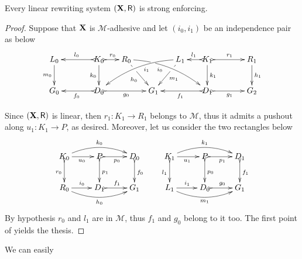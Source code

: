 \begin{proposition}\label{prop:linstrong}
	Every linear rewriting system $(\textbf {\textup{X}}, \mathsf{R})$ is strong enforcing.
\end{proposition}
\begin{proof}
	Suppose that $\textbf {\textup{X}}$ is $\mathcal{M}$-adhesive and let $(i_0, i_1)$ be
	an independence pair as below
	\[
	\xymatrix@C=15pt{L_0 \ar[d]_{m_0}&& K_0
		\ar[d]_{k_0}\ar@{>->}[ll]_{l_0} \ar@{>->}[r]^{r_0} & R_0
		\ar@/^.35cm/[drrr]|(.3)\hole_(.4){i_0} \ar[dr]|(.3)\hole_{h_0}
		&& L_1 \ar@/_.35cm/[dlll]^(.4){i_1} \ar[dl]|(.3)\hole^{m_1}& K_1
		\ar[d]^{k_1}\ar@{>->}[l]_{l_1} \ar@{>->}[rr]^{r_1} && R_1
		\ar[d]^{h_1} \\G_0 && \ar@{>->}[ll]^{f_0} D_0
		\ar@{>->}[rr]_{g_0}&& G_1 && \ar@{>->}[ll]^{f_1} D_1
		\ar@{>->}[rr]_{g_1}&& G_2}\]
	
	Since $(\textbf {\textup{X}}, \mathsf{R})$ is linear, then $r_1\colon K_1\to R_1$ belongs to
	$\mathcal{M}$, thus it admits a pushout along $u_1\colon K_1\to P$,
	as desired. Moreover, let us consider the two rectangles below
	\[
	\xymatrix{K_0 \ar@/^.4cm/[rr]^{k_0}\ar@{>->}[d]_{r_0}\ar[r]_{u_0}
		&P\ar@{>->}[d]^{p_1} \ar@{>->}[r]_{p_0} & D_0
		\ar@{>->}[d]^{f_0}& K_1
		\ar@/^.4cm/[rr]^{k_1}\ar@{>->}[d]_{l_1}\ar[r]_{u_1}
		&P\ar@{>->}[d]^{p_0} \ar@{>->}[r]_{p_1} & D_1
		\ar@{>->}[d]^{f_1}\\ R_0 \ar@/_.4cm/[rr]_{h_0} \ar[r]^{i_0}&D_1
		\ar@{>->}[r]^{f_1} & G_1& L_1 \ar@/_.4cm/[rr]_{m_1}
		\ar[r]^{i_1}&D_0 \ar@{>->}[r]^{g_0} & G_1} \] By hypothesis
	$r_0$ and $l_1$ are in $\mathcal{M}$, thus $f_1$ and $g_0$ belong to
	it too. The first point of  yields the thesis.
\end{proof}

We can easily 

